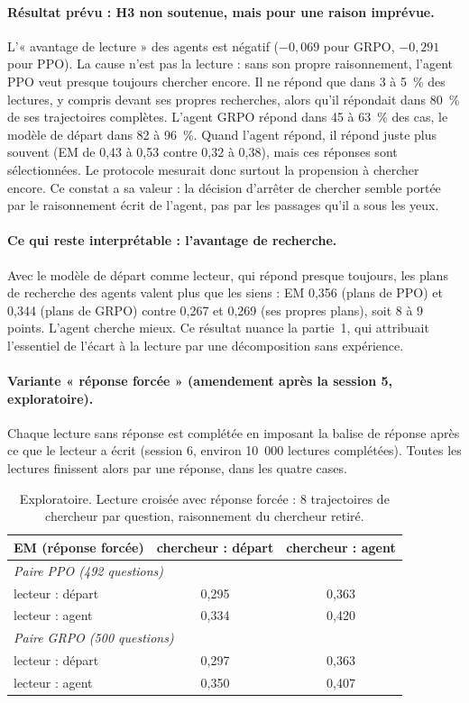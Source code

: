 \paragraph{Résultat prévu : H3 non soutenue, mais pour une raison imprévue.} L'« avantage de lecture » des agents est négatif ($-0{,}069$ pour GRPO, $-0{,}291$ pour PPO). La cause n'est pas la lecture : sans son propre raisonnement, l'agent PPO veut presque toujours chercher encore. Il ne répond que dans 3 à 5~\% des lectures, y compris devant ses propres recherches, alors qu'il répondait dans 80~\% de ses trajectoires complètes. L'agent GRPO répond dans 45 à 63~\% des cas, le modèle de départ dans 82 à 96~\%. Quand l'agent répond, il répond juste plus souvent (EM de 0,43 à 0,53 contre 0,32 à 0,38), mais ces réponses sont sélectionnées. Le protocole mesurait donc surtout la propension à chercher encore. Ce constat a sa valeur : la décision d'arrêter de chercher semble portée par le raisonnement écrit de l'agent, pas par les passages qu'il a sous les yeux.

\paragraph{Ce qui reste interprétable : l'avantage de recherche.} Avec le modèle de départ comme lecteur, qui répond presque toujours, les plans de recherche des agents valent plus que les siens : EM 0,356 (plans de PPO) et 0,344 (plans de GRPO) contre 0,267 et 0,269 (ses propres plans), soit 8 à 9 points. L'agent cherche mieux. Ce résultat nuance la partie~1, qui attribuait l'essentiel de l'écart à la lecture par une décomposition sans expérience.

\paragraph{Variante « réponse forcée » (amendement après la session 5, exploratoire).} Chaque lecture sans réponse est complétée en imposant la balise de réponse après ce que le lecteur a écrit (session 6, environ 10~000 lectures complétées). Toutes les lectures finissent alors par une réponse, dans les quatre cases.

\begin{table}[h]\centering\small
\begin{tabular}{lcc}\toprule
EM (réponse forcée) & chercheur : départ & chercheur : agent\\\midrule
\multicolumn{3}{l}{\emph{Paire PPO (492 questions)}}\\
lecteur : départ & 0,295 & 0,363\\
lecteur : agent & 0,334 & 0,420\\
\multicolumn{3}{l}{\emph{Paire GRPO (500 questions)}}\\
lecteur : départ & 0,297 & 0,363\\
lecteur : agent & 0,350 & 0,407\\\bottomrule
\end{tabular}
\caption{Exploratoire. Lecture croisée avec réponse forcée : 8 trajectoires de chercheur par question, raisonnement du chercheur retiré.}\label{tab:lecture}
\end{table}

